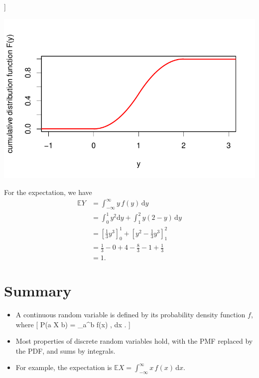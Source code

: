 \documentclass[
  letterpaper,
]{report}
\providecommand{\tightlist}{%
  \setlength{\itemsep}{0pt}\setlength{\parskip}{0pt}}\usepackage{longtable,booktabs,array}
\theoremstyle{definition}
\theoremstyle{definition}
\theoremstyle{remark}
\begin{document}
{]}

\includegraphics{sections/L15-continuous_files/figure-pdf/second-cdf-1.pdf}

For the expectation, we have \begin{align*}
\mathbb EY &= \int_{-\infty}^{\infty} y\, f(y) \, \mathrm dy \\
  &= \int_0^1 y^2 \mathrm dy + \int_1^2 y(2 - y)\, \mathrm dy \\
  &= \left[ \tfrac13 y^3 \right]_0^1 + \left[  y^2 - \tfrac13 y^3 \right]_1^2 \\
  &= \tfrac13 - 0 + 4 - \tfrac83 - 1 + \tfrac13 \\
  &= 1 .
\end{align*}

\hypertarget{summary-L15}{%
\section*{Summary}\label{summary-L15}}


\begin{itemize}
\tightlist
\item
  A continuous random variable is defined by its probability density
  function \(f\), where {[} \mathbb P(a \leq X \leq b) = \int\_a\^{}b
  f(x) , \mathrm dx . {]}
\item
  Most properties of discrete random variables hold, with the PMF
  replaced by the PDF, and sums by integrals.
\item
  For example, the expectation is
  \(\mathbb EX = \displaystyle\int_{-\infty}^\infty x\, f(x) \, \mathrm dx\).
\end{itemize}
\end{document}
